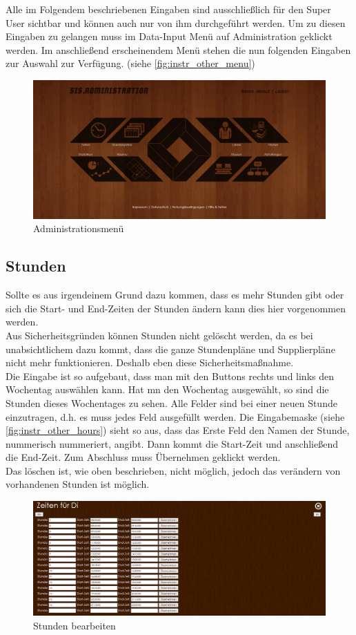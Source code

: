 Alle im Folgendem beschriebenen Eingaben sind ausschließlich für den Super User sichtbar und können auch nur von ihm durchgeführt werden. Um zu diesen Eingaben zu gelangen muss im Data-Input Menü auf Administration geklickt werden. Im anschließend erscheinendem Menü stehen die nun folgenden Eingaben zur Auswahl zur Verfügung. (siehe \autoref{fig:instr_other_menu})
\begin{figure}[H]
\centering
\includegraphics[keepaspectratio=true, width=17cm]{images/screenshots/admin_menu.png}
\caption{Administrationsmenü}
\label{fig:instr_other_menu}
\end{figure}
\subsection{Stunden}
Sollte es aus irgendeinem Grund dazu kommen, dass es mehr Stunden gibt oder sich die Start- und End-Zeiten der Stunden ändern kann dies hier vorgenommen werden.\\
Aus Sicherheitsgründen können Stunden nicht gelöscht werden, da es bei unabsichtlichem dazu kommt, dass die ganze Stundenpläne und Supplierpläne nicht mehr funktionieren. Deshalb eben diese Sicherheitsmaßnahme.\\
Die Eingabe ist so aufgebaut, dass man mit den Buttons rechts und links den Wochentag auswählen kann. Hat mn den Wochentag ausgewählt, so sind die Stunden dieses Wochentages zu sehen. Alle Felder sind bei einer neuen Stunde einzutragen, d.h. es muss jedes Feld ausgefüllt werden. Die Eingabemaske (siehe \autoref{fig:instr_other_hours}) sieht so aus, dass das Erste Feld den Namen der Stunde, nummerisch nummeriert, angibt. Dann kommt die Start-Zeit und anschließend die End-Zeit. Zum Abschluss muss Übernehmen geklickt werden.\\
Das löschen ist, wie oben beschrieben, nicht möglich, jedoch das verändern von vorhandenen Stunden ist möglich. 
\begin{figure}[H]
\centering
\includegraphics[keepaspectratio=true, width=17cm]{images/screenshots/hours_input.png}
\caption{Stunden bearbeiten}
\label{fig:instr_other_hours}
\end{figure}
